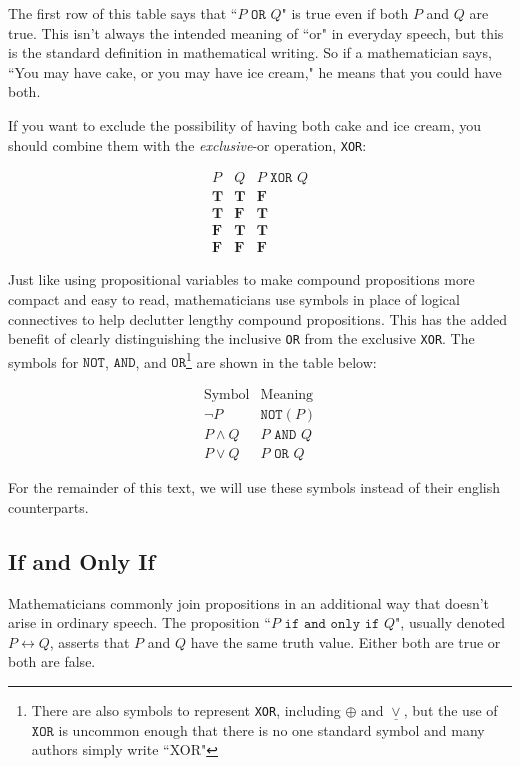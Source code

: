 \documentclass[11pt,oneside]{book}
\theoremstyle{definition}
\newcommand{\T}{\mathbf{T}}
\newcommand{\F}{\mathbf{F}}
\begin{document}
The first row of this table says that ``$P \texttt{ OR } Q$" is true even if both $P$ and $Q$ are true.
This isn't always the intended meaning of ``or" in everyday speech, but this is the standard definition in mathematical writing.
So if a mathematician says, ``You may have cake, or you may have ice cream," he means that you could have both.

If you want to exclude the possibility of having both cake and ice cream, you should combine them with the \emph{exclusive}-or operation, \texttt{XOR}:

\[\begin{array}{c|c|c}
    P & Q & P \texttt{ XOR } Q \\
    \hline
    \T & \T & \F \\
    \T & \F & \T \\
    \F & \T & \T \\
    \F & \F & \F
\end{array}\]

Just like using propositional variables to make compound propositions more compact and easy to read, mathematicians use symbols in place of logical connectives to help declutter lengthy compound propositions.
This has the added benefit of clearly distinguishing the inclusive \texttt{OR} from the exclusive \texttt{XOR}.
The symbols for $\texttt{NOT}$, $\texttt{AND}$, and $\texttt{OR}$\footnote{
    There are also symbols to represent \texttt{XOR}, including $\oplus$ and $\underline{\lor}$, but the use of $\texttt{XOR}$ is uncommon enough that there is no one standard symbol and many authors simply write ``XOR"
} are shown in the table below:

\[\begin{array}{c|c}
    \text{Symbol} & \text{Meaning} \\
    \hline
    \lnot P & \texttt{NOT}(P) \\
    P \land Q & P \texttt{ AND } Q \\
    P \lor Q & P \texttt{ OR } Q
\end{array}\]

For the remainder of this text, we will use these symbols instead of their english counterparts.


\subsection{If and Only If}\label{sec:Biconditional}
Mathematicians commonly join propositions in an additional way that doesn't arise in ordinary speech.
The proposition ``$P \texttt{ if and only if } Q$", usually denoted $P \leftrightarrow Q$, asserts that $P$ and $Q$ have the same truth value.
Either both are true or both are false.
\end{document}
